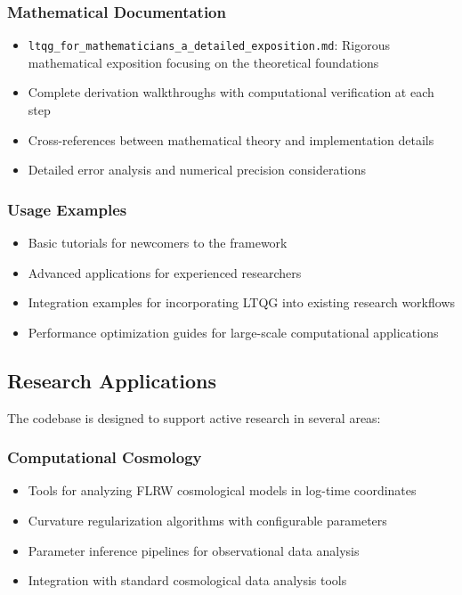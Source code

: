\subsubsection{Mathematical Documentation}

\begin{itemize}
\item \texttt{ltqg\_for\_mathematicians\_a\_detailed\_exposition.md}: Rigorous mathematical exposition focusing on the theoretical foundations
\item Complete derivation walkthroughs with computational verification at each step
\item Cross-references between mathematical theory and implementation details
\item Detailed error analysis and numerical precision considerations
\end{itemize}

\subsubsection{Usage Examples}

\begin{itemize}
\item Basic tutorials for newcomers to the framework
\item Advanced applications for experienced researchers
\item Integration examples for incorporating LTQG into existing research workflows
\item Performance optimization guides for large-scale computational applications
\end{itemize}

\subsection{Research Applications}
\label{subsec:research_applications}

The codebase is designed to support active research in several areas:

\subsubsection{Computational Cosmology}

\begin{itemize}
\item Tools for analyzing FLRW cosmological models in log-time coordinates
\item Curvature regularization algorithms with configurable parameters
\item Parameter inference pipelines for observational data analysis
\item Integration with standard cosmological data analysis tools
\end{itemize}

